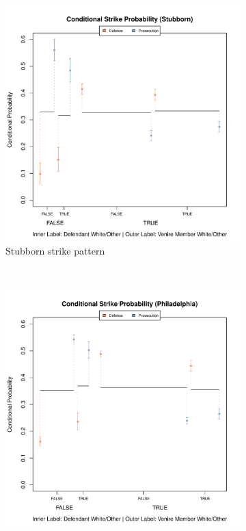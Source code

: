 \documentclass[12pt]{article}
\begin{document}
\begin{figure}[h!]
  \centering
  \begin{subfigure}{0.32\textwidth}
    \includegraphics[scale = 0.32]{StubbornCompPlot}
    \caption{\footnotesize Stubborn strike pattern}
    \label{fig:stubcomp}
  \end{subfigure}
  ~
  \begin{subfigure}{0.32\textwidth}
    \includegraphics[scale = 0.32]{PhillyCompPlot}

\end{subfigure}
\end{figure}
\end{document}
